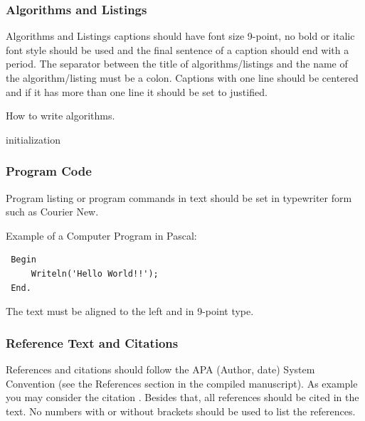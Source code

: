\documentclass[a4paper,twoside]{article}
\begin{document}
\subsubsection{Algorithms and Listings}

Algorithms and Listings captions should have font size 9-point, no bold or
italic font style should be used and the final sentence of a caption should end with a period. The separator between the title of algorithms/listings and the name of the algorithm/listing must be a colon.
Captions with one line should be centered and if it has more than one line it should be set to justified.

\begin{algorithm}[!h]
 \caption{How to write algorithms.}
 initialization\;
\end{algorithm}


\bigskip
\subsubsection{Program Code}\label{subsubsec:program_code}

Program listing or program commands in text should be set in
typewriter form such as Courier New.

Example of a Computer Program in Pascal:

\begin{small}
\begin{verbatim}
 Begin
     Writeln('Hello World!!');
 End.
\end{verbatim}
\end{small}


The text must be aligned to the left and in 9-point type.

\subsubsection{Reference Text and Citations}

References and citations should follow the APA (Author, date)
System Convention (see the References section in the compiled
manuscript). As example you may consider the citation
\cite{Smith98}. Besides that, all references should be cited in the
text. No numbers with or without brackets should be used to list the
references.
\end{document}
